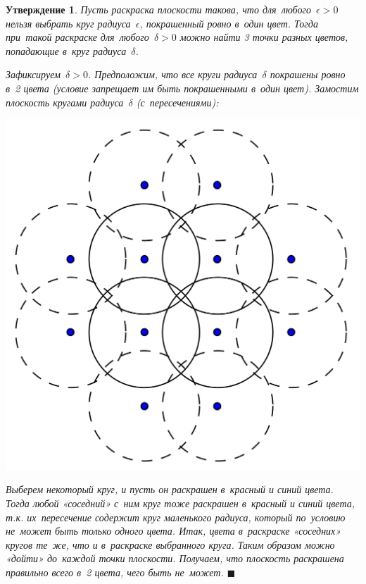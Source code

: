 \documentclass{report}%
\newtheorem{claim}{Утверждение}
\newenvironment{proof}{\par\noindent{\bf Доказательство.}}{\hfill$\scriptstyle\blacksquare$}
\begin{document}
\begin{claim}
		Пусть раскраска плоскости такова, что для~любого~$\epsilon > 0$ нельзя выбрать круг радиуса~$\epsilon$,
		покрашенный ровно в~один цвет. Тогда при~такой раскраске для~любого~$\delta > 0$
		можно найти 3 точки разных цветов, попадающие в~круг радиуса~$\delta$. \\
		\begin{proof}
				Зафиксируем~$\delta > 0$. Предположим, что все круги радиуса~$\delta$ покрашены ровно в~2 цвета
				(условие запрещает им быть покрашенными в~один цвет).
				Замостим плоскость кругами радиуса~$\delta$ (с~пересечениями): \\
				\begin{center}
						\includegraphics[scale = 0.45]{my_claim2}
				\end{center}
				
				\noindent Выберем некоторый круг, и пусть он раскрашен в~красный и синий цвета.
				Тогда любой «соседний» с~ним круг тоже раскрашен в~красный и синий цвета,
				т.к. их~пересечение содержит круг маленького радиуса, который по~условию не~может быть только одного цвета.
				Итак, цвета в~раскраске «соседних» кругов те~же, что и в~раскраске выбранного круга.
				Таким образом можно «дойти» до~каждой точки плоскости.
				Получаем, что плоскость раскрашена правильно всего в~2 цвета, чего быть не~может.
		\end{proof}
\end{claim}
\end{document}
